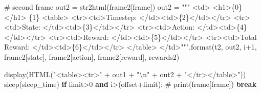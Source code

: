 \documentclass[
  letterpaper,
]{scrbook}
\newenvironment{Shaded}{\begin{snugshade}}{\end{snugshade}}
\newcommand{\BuiltInTok}[1]{\textcolor[rgb]{0.00,0.23,0.31}{#1}}
\newcommand{\CharTok}[1]{\textcolor[rgb]{0.13,0.47,0.30}{#1}}
\newcommand{\CommentTok}[1]{\textcolor[rgb]{0.37,0.37,0.37}{#1}}
\newcommand{\ControlFlowTok}[1]{\textcolor[rgb]{0.00,0.23,0.31}{\textbf{#1}}}
\newcommand{\DecValTok}[1]{\textcolor[rgb]{0.68,0.00,0.00}{#1}}
\newcommand{\KeywordTok}[1]{\textcolor[rgb]{0.00,0.23,0.31}{\textbf{#1}}}
\newcommand{\NormalTok}[1]{\textcolor[rgb]{0.00,0.23,0.31}{#1}}
\newcommand{\OperatorTok}[1]{\textcolor[rgb]{0.37,0.37,0.37}{#1}}
\newcommand{\SpecialCharTok}[1]{\textcolor[rgb]{0.37,0.37,0.37}{#1}}
\newcommand{\StringTok}[1]{\textcolor[rgb]{0.13,0.47,0.30}{#1}}
\begin{document}
\begin{Shaded}
\begin{Highlighting}[]
            \CommentTok{\# second frame}
\NormalTok{            out2 }\OperatorTok{=}\NormalTok{ str2html(frame2[}\StringTok{\textquotesingle{}frame\textquotesingle{}}\NormalTok{])}
\NormalTok{            out2 }\OperatorTok{=} \StringTok{"""}
\StringTok{            \textless{}td\textgreater{}}
\StringTok{            \textless{}h1\textgreater{}}\SpecialCharTok{\{0\}}\StringTok{\textless{}/h1\textgreater{}}
\StringTok{            }\SpecialCharTok{\{1\}}
\StringTok{            \textless{}table\textgreater{}}
\StringTok{                \textless{}tr\textgreater{}\textless{}td\textgreater{}Timestep: \textless{}/td\textgreater{}\textless{}td\textgreater{}}\SpecialCharTok{\{2\}}\StringTok{\textless{}/td\textgreater{}\textless{}/tr\textgreater{}}
\StringTok{                \textless{}tr\textgreater{}\textless{}td\textgreater{}State: \textless{}/td\textgreater{}\textless{}td\textgreater{}}\SpecialCharTok{\{3\}}\StringTok{\textless{}/td\textgreater{}\textless{}/tr\textgreater{}}
\StringTok{                \textless{}tr\textgreater{}\textless{}td\textgreater{}Action: \textless{}/td\textgreater{}\textless{}td\textgreater{}}\SpecialCharTok{\{4\}}\StringTok{\textless{}/td\textgreater{}\textless{}/tr\textgreater{}}
\StringTok{                \textless{}tr\textgreater{}\textless{}td\textgreater{}Reward: \textless{}/td\textgreater{}\textless{}td\textgreater{}}\SpecialCharTok{\{5\}}\StringTok{\textless{}/td\textgreater{}\textless{}/tr\textgreater{}}
\StringTok{                \textless{}tr\textgreater{}\textless{}td\textgreater{}Total Reward: \textless{}/td\textgreater{}\textless{}td\textgreater{}}\SpecialCharTok{\{6\}}\StringTok{\textless{}/td\textgreater{}\textless{}/tr\textgreater{}}
\StringTok{            \textless{}/table\textgreater{}}
\StringTok{            \textless{}/td\textgreater{}"""}\NormalTok{.}\BuiltInTok{format}\NormalTok{(t2, out2, i}\OperatorTok{+}\DecValTok{1}\NormalTok{, frame2[}\StringTok{\textquotesingle{}state\textquotesingle{}}\NormalTok{], frame2[}\StringTok{\textquotesingle{}action\textquotesingle{}}\NormalTok{], frame2[}\StringTok{\textquotesingle{}reward\textquotesingle{}}\NormalTok{], rewards2)}


\NormalTok{            display(HTML(}\StringTok{"\textless{}table\textgreater{}\textless{}tr\textgreater{}"} \OperatorTok{+}\NormalTok{ out1 }\OperatorTok{+} \StringTok{"}\CharTok{\textbackslash{}n}\StringTok{"} \OperatorTok{+}\NormalTok{ out2 }\OperatorTok{+} \StringTok{"\textless{}/tr\textgreater{}\textless{}/table\textgreater{}"}\NormalTok{))}
\NormalTok{            sleep(sleep\_time)}
            \ControlFlowTok{if}\NormalTok{ limit}\OperatorTok{\textgreater{}}\DecValTok{0} \KeywordTok{and}\NormalTok{ i}\OperatorTok{\textgreater{}}\NormalTok{(offset}\OperatorTok{+}\NormalTok{limit): }
                \CommentTok{\# print(frame[\textquotesingle{}frame\textquotesingle{}])}
                \ControlFlowTok{break}
\end{Highlighting}
\end{Shaded}
\end{document}
